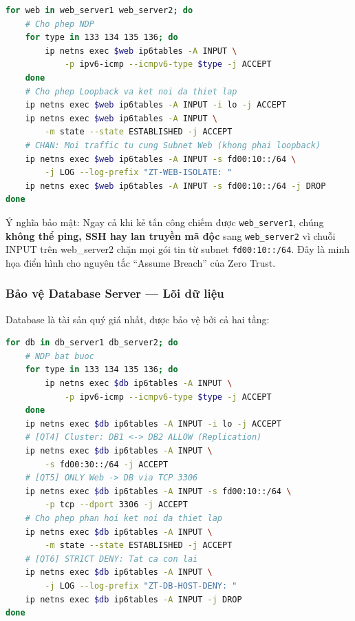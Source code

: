 \begin{lstlisting}[style=customcode, language=bash, caption={QT1 — Cách ly ngang Web Server chống Lateral Movement.}, label=lst:web_isolation]
for web in web_server1 web_server2; do
    # Cho phep NDP
    for type in 133 134 135 136; do
        ip netns exec $web ip6tables -A INPUT \
            -p ipv6-icmp --icmpv6-type $type -j ACCEPT
    done
    # Cho phep Loopback va ket noi da thiet lap
    ip netns exec $web ip6tables -A INPUT -i lo -j ACCEPT
    ip netns exec $web ip6tables -A INPUT \
        -m state --state ESTABLISHED -j ACCEPT
    # CHAN: Moi traffic tu cung Subnet Web (khong phai loopback)
    ip netns exec $web ip6tables -A INPUT -s fd00:10::/64 \
        -j LOG --log-prefix "ZT-WEB-ISOLATE: "
    ip netns exec $web ip6tables -A INPUT -s fd00:10::/64 -j DROP
done
\end{lstlisting}

Ý nghĩa bảo mật: Ngay cả khi kẻ tấn công chiếm được \texttt{web\_server1}, chúng \textbf{không thể ping, SSH hay lan truyền mã độc} sang \texttt{web\_server2} vì chuỗi INPUT trên web\_server2 chặn mọi gói tin từ subnet \texttt{fd00:10::/64}. Đây là minh họa điển hình cho nguyên tắc ``Assume Breach'' của Zero Trust.

\subsubsection{Bảo vệ Database Server — Lõi dữ liệu}

Database là tài sản quý giá nhất, được bảo vệ bởi cả hai tầng:

\begin{lstlisting}[style=customcode, language=bash, caption={Bảo vệ Database Server ở cấp Host (QT4 + QT5 + QT6).}, label=lst:db_protect]
for db in db_server1 db_server2; do
    # NDP bat buoc
    for type in 133 134 135 136; do
        ip netns exec $db ip6tables -A INPUT \
            -p ipv6-icmp --icmpv6-type $type -j ACCEPT
    done
    ip netns exec $db ip6tables -A INPUT -i lo -j ACCEPT
    # [QT4] Cluster: DB1 <-> DB2 ALLOW (Replication)
    ip netns exec $db ip6tables -A INPUT \
        -s fd00:30::/64 -j ACCEPT
    # [QT5] ONLY Web -> DB via TCP 3306
    ip netns exec $db ip6tables -A INPUT -s fd00:10::/64 \
        -p tcp --dport 3306 -j ACCEPT
    # Cho phep phan hoi ket noi da thiet lap
    ip netns exec $db ip6tables -A INPUT \
        -m state --state ESTABLISHED -j ACCEPT
    # [QT6] STRICT DENY: Tat ca con lai
    ip netns exec $db ip6tables -A INPUT \
        -j LOG --log-prefix "ZT-DB-HOST-DENY: "
    ip netns exec $db ip6tables -A INPUT -j DROP
done
\end{lstlisting}

